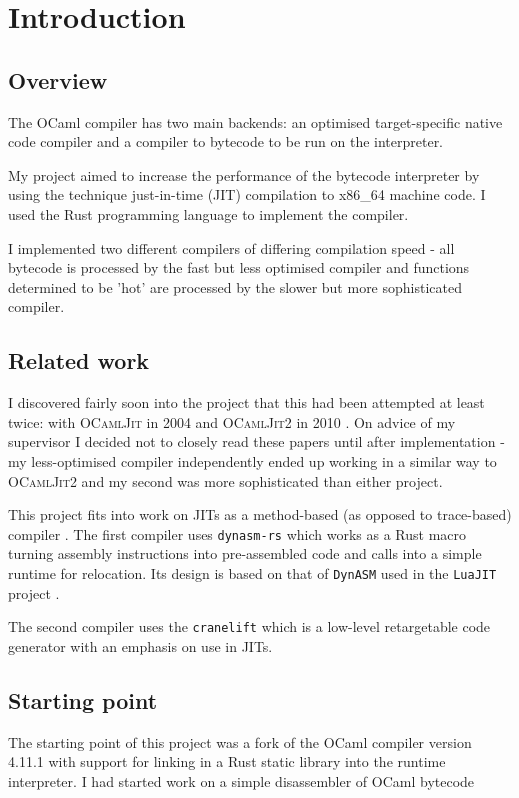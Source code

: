 \chapter{Introduction}

\section{Overview}

The OCaml compiler has two main backends: an optimised target-specific native code compiler and a
compiler to bytecode to be run on the interpreter.

My project aimed to increase the performance of the bytecode interpreter by using the technique
just-in-time (JIT) compilation to x86\_64 machine code. I used the Rust programming language to
implement the compiler.

I implemented two different compilers of differing compilation speed - all bytecode is processed by
the fast but less optimised compiler and functions determined to be 'hot' are processed by the
slower but more sophisticated compiler.

\section{Related work}

I discovered fairly soon into the project that this had been attempted at least twice: with
\textsc{OCamlJit} in 2004 \cite{ocjit1} and \textsc{OCamlJit2} in 2010 \cite{ocjit2}. On advice
of my supervisor I decided not to closely read these papers until after implementation - my
less-optimised compiler independently ended up working in a similar way to \textsc{OCamlJit2} and
my second was more sophisticated than either project.

This project fits into work on JITs as a method-based (as opposed to trace-based) compiler
\cite{pyket}. The first compiler uses \texttt{dynasm-rs} \cite{dynasmrs} which works as a Rust
macro
turning assembly instructions into pre-assembled code and calls into a simple runtime for
relocation. Its design is based on that of \texttt{DynASM} used in the \texttt{LuaJIT} project
\cite{dynasm}.

The second compiler uses the \texttt{cranelift} \cite{cranelift} which is a low-level retargetable
code generator with an emphasis on use in JITs.

\section{Starting point}

The starting point of this project was a fork of the OCaml compiler version 4.11.1 with support for
linking in a Rust static library into the runtime interpreter. I had started work on a simple
disassembler of OCaml bytecode

